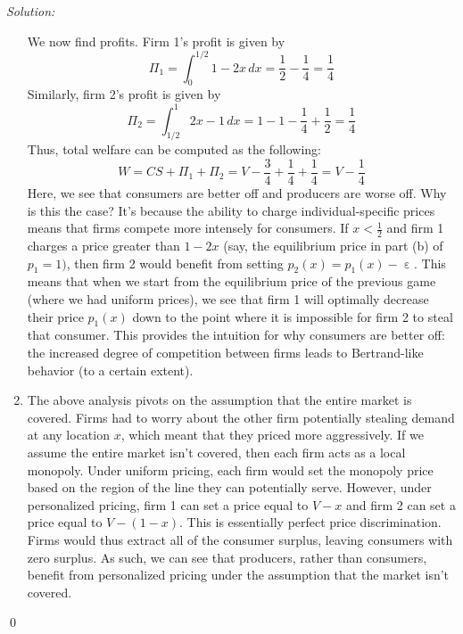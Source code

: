 \documentclass[12pt]{article}
\DeclareMathOperator{\eps}{\varepsilon}
\newenvironment{sol}
    {\emph{Solution:}
    }
    {
    \qed
    }
\begin{document}
\begin{sol}
\begin{enumerate}[label=\alph*) ]
        We now find profits. Firm 1's profit is given by
        \[\Pi_1 = \int_{0}^{1/2} 1 - 2x \, dx = \frac{1}{2} - \frac{1}{4} = \frac{1}{4}\]
        Similarly, firm 2's profit is given by
        \[\Pi_2 = \int_{1/2}^{1} 2x -1 \, dx = 1 - 1 - \frac{1}{4} + \frac{1}{2} = \frac{1}{4}\]
        Thus, total welfare can be computed as the following:
        \[W = CS + \Pi_1 + \Pi_2 = V - \frac{3}{4} + \frac{1}{4} + \frac{1}{4} = V - \frac{1}{4}\]
        Here, we see that consumers are better off and producers are worse off. Why is this the case? It's because the ability to charge individual-specific prices means that firms compete more intensely for consumers. If $x < \frac{1}{2}$ and firm 1 charges a price greater than $1-2x$ (say, the equilibrium price in part (b) of $p_1 = 1)$, then firm 2 would benefit from setting $p_2(x) = p_1(x) - \eps$. This means that when we start from the equilibrium price of the previous game (where we had uniform prices), we see that firm 1 will optimally decrease their price $p_1(x)$ down to the point where it is impossible for firm 2 to steal that consumer. This provides the intuition for why consumers are better off: the increased degree of competition between firms leads to Bertrand-like behavior (to a certain extent). 
        \item The above analysis pivots on the assumption that the entire market is covered. Firms had to worry about the other firm potentially stealing demand at any location $x$, which meant that they priced more aggressively. If we assume the entire market isn't covered, then each firm acts as a local monopoly. Under uniform pricing, each firm would set the monopoly price based on the region of the line they can potentially serve. However, under personalized pricing, firm 1 can set a price equal to $V - x$ and firm 2 can set a price equal to $V - (1-x)$. This is essentially perfect price discrimination. Firms would thus extract all of the consumer surplus, leaving consumers with zero surplus. As such, we can see that producers, rather than consumers, benefit from personalized pricing under the assumption that the market isn't covered.
    \end{enumerate}
\end{sol}

    
\end{document}
